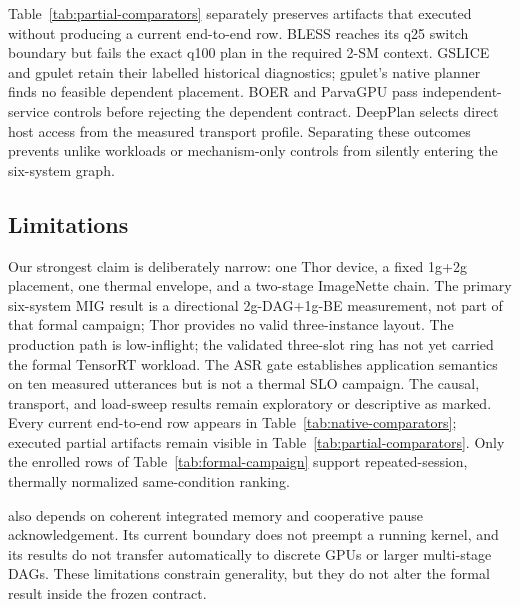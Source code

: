 \PninePartialEvidenceTable

Table~\ref{tab:partial-comparators} separately preserves artifacts that
executed without producing a current end-to-end row.  BLESS reaches its q25
switch boundary but fails the exact q100 plan in the required 2-SM context.
GSLICE and gpulet retain their labelled historical diagnostics; gpulet's
native planner finds no feasible dependent placement.  BOER and ParvaGPU pass
independent-service controls before rejecting the dependent contract.
DeepPlan selects direct host access from the measured transport profile.
Separating these outcomes prevents unlike workloads or mechanism-only controls
from silently entering the six-system graph.

\subsection{Limitations}

Our strongest claim is deliberately narrow: one Thor device, a fixed 1g+2g
placement, one thermal envelope, and a two-stage ImageNette chain.  The
primary six-system MIG result is a directional 2g-DAG+1g-BE measurement, not
part of that formal campaign; Thor provides no valid three-instance layout.  The
production path is low-inflight; the validated three-slot ring has not yet
carried the formal TensorRT workload.  The ASR gate establishes application
semantics on ten measured utterances but is not a thermal SLO campaign.  The
causal, transport, and load-sweep results remain exploratory or descriptive as
marked.  Every current end-to-end row appears in
Table~\ref{tab:native-comparators}; executed partial artifacts remain visible
in Table~\ref{tab:partial-comparators}.  Only the enrolled rows of
Table~\ref{tab:formal-campaign} support repeated-session, thermally normalized
same-condition ranking.

\sys also depends on coherent integrated memory and cooperative pause
acknowledgement.  Its current boundary does not preempt a running kernel, and
its results do not transfer automatically to discrete GPUs or larger
multi-stage DAGs.  These limitations constrain generality, but they do not
alter the formal result inside the frozen contract.
